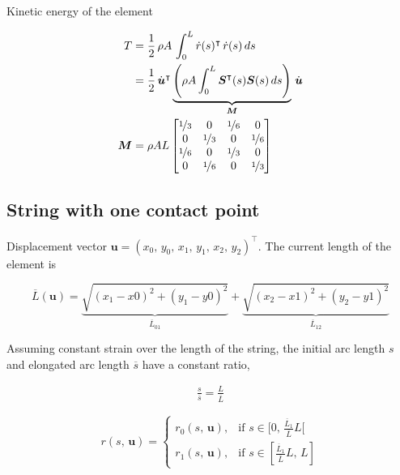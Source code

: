 Kinetic energy of the element

\begin{align*}
T &= \frac{1}{2}\,\rho A \, \int_{0}^{L} \dot{r}(s)^\intercal\,\dot{r}(s)\,ds \\
&= \frac{1}{2}\,\dot{\boldsymbol{u}}^\intercal \underbrace{\left( \rho A \int_0^L \boldsymbol{S}^\intercal(s) \boldsymbol{S}(s)\,ds \right)}_{\boldsymbol{M}}\,\dot{\boldsymbol{u}} \\
\boldsymbol{M} &= \rho AL
\begin{bmatrix}
\nicefrac{1}{3} & 0 & \nicefrac{1}{6} & 0 \\
0 & \nicefrac{1}{3} & 0 & \nicefrac{1}{6} \\
\nicefrac{1}{6} & 0 & \nicefrac{1}{3} & 0 \\
0 & \nicefrac{1}{6} & 0 & \nicefrac{1}{3}
\end{bmatrix}
\end{align*}

\subsection{String with one contact point}

Displacement vector $\boldsymbol{u} = (x_0,\,y_0,\,x_1,\,y_1,\,x_2,\,y_2)^\intercal$. The current length of the element is

$$
\overline{L}(\boldsymbol{u}) =
\underbrace{
\sqrt{(x_{1} - x{0})^2 + (y_{1} - y{0})^2}
}_{\overline{L}_{01}}
+
\underbrace{
\sqrt{(x_{2} - x{1})^2 + (y_{2} - y{1})^2}
}_{\overline{L}_{12}}
$$

Assuming constant strain over the length of the string, the initial arc length $s$ and elongated arc length $\overline{s}$ have a constant ratio,

\begin{align*}
\frac{s}{\overline{s}} = \frac{L}{\overline{L}}
\end{align*}

$$
r(s,\,\boldsymbol{u}) =
\begin{cases} 
 r_0(s,\,\boldsymbol{u}), & \text{if } s \in [ 0, \, \frac{\overline{L}_1}{\overline{L}}L [ \\
 r_1(s,\,\boldsymbol{u}), & \text{if } s \in [ \frac{\overline{L}_1}{\overline{L}}L, \, L ]
\end{cases}
$$

